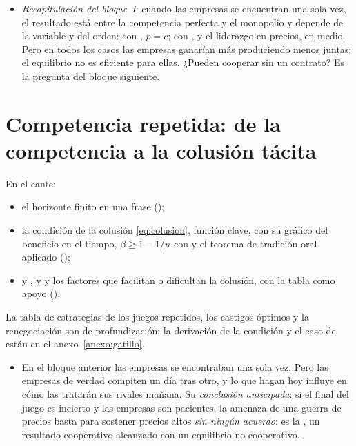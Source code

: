 \documentclass[11pt]{article}
\begin{document}
\begin{itemize}
\item \emph{Recapitulación del bloque~I}: cuando las empresas se encuentran una sola vez, el resultado está entre la competencia perfecta y el monopolio y depende de la variable y del orden: con , $p=c$; con ,  y el liderazgo en precios, en medio. Pero en todos los casos las empresas ganarían más produciendo menos juntas: el equilibrio no es eficiente para ellas. ¿Pueden cooperar sin un contrato? Es la pregunta del bloque siguiente.
\end{itemize}


\section{Competencia repetida:\cortetitulo{} de la competencia a la colusión tácita}\label{sec:analisis-dinamico}

\begin{notaopositor}
En el cante:
\begin{itemize}
\item el horizonte finito en una frase ();
\item la condición de la colusión \eqref{eq:colusion}, función clave, con su gráfico del beneficio en el tiempo, $\beta\geq1-1/n$ con  y el teorema de tradición oral aplicado ();
\item {} y ,  y  y los factores que facilitan o dificultan la colusión, con la tabla como apoyo ().
\end{itemize}
La tabla de estrategias de los juegos repetidos, los castigos óptimos y la renegociación son de profundización; la derivación de la condición y el caso de  están en el anexo~\ref{anexo:gatillo}.
\end{notaopositor}

\begin{itemize}
\item En el bloque anterior las empresas se encontraban una sola vez. Pero las empresas de verdad compiten un día tras otro, y lo que hagan hoy influye en cómo las tratarán sus rivales mañana. Su \emph{conclusión anticipada}: si el final del juego es incierto y las empresas son pacientes, la amenaza de una guerra de precios basta para sostener precios altos \emph{sin ningún acuerdo}: es la , un resultado cooperativo alcanzado con un equilibrio no cooperativo.
\end{itemize}
\end{document}
